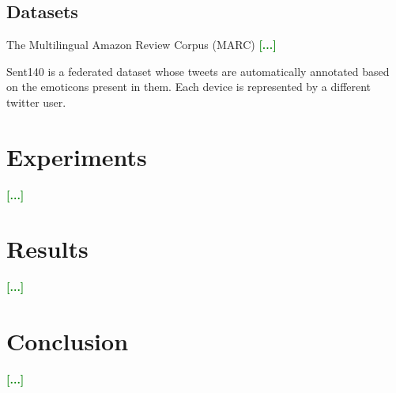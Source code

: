 \documentclass{esannV2}
\begin{document}
\subsection{Datasets}
The Multilingual Amazon Review Corpus (MARC) \cite{keung2020multilingual} \textcolor{green}{\textbf{[...]}}


Sent140 \cite{caldas2019leaf} is a federated dataset whose tweets are automatically annotated based on the emoticons present in them. Each device is represented by a different twitter user.

\section{Experiments}
\textcolor{green}{\textbf{[...]}}

\section{Results}
\textcolor{green}{\textbf{[...]}}

\section{Conclusion}
\textcolor{green}{\textbf{[...]}}


\begin{footnotesize}
 
 
\end{footnotesize}

%
\end{document}
